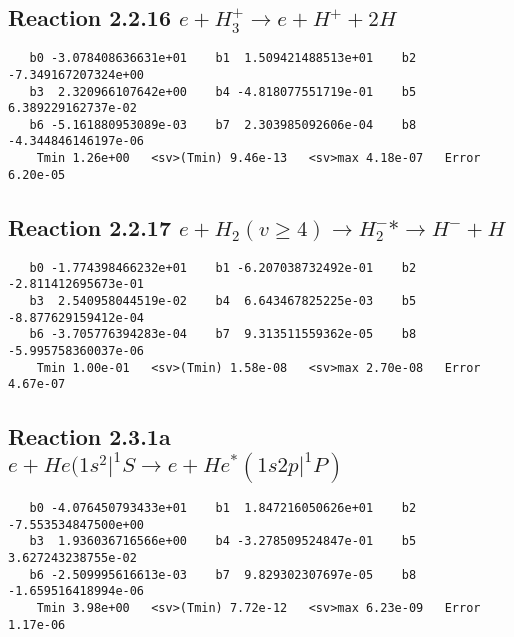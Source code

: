\documentclass[12pt]{article}
\begin{document}
                        


\newpage
\subsection{
Reaction 2.2.16 $  e + H_3^+ \rightarrow e + H^+ + 2H$}


\begin{small}\begin{verbatim}
   b0 -3.078408636631e+01    b1  1.509421488513e+01    b2 -7.349167207324e+00
   b3  2.320966107642e+00    b4 -4.818077551719e-01    b5  6.389229162737e-02
   b6 -5.161880953089e-03    b7  2.303985092606e-04    b8 -4.344846146197e-06
    Tmin 1.26e+00   <sv>(Tmin) 9.46e-13   <sv>max 4.18e-07   Error 6.20e-05
\end{verbatim}\end{small}

\newpage
\subsection{
Reaction 2.2.17 $  e + H_2(v \geq 4) \rightarrow H_2^-* \rightarrow H^- + H$}


\begin{small}\begin{verbatim}
   b0 -1.774398466232e+01    b1 -6.207038732492e-01    b2 -2.811412695673e-01
   b3  2.540958044519e-02    b4  6.643467825225e-03    b5 -8.877629159412e-04
   b6 -3.705776394283e-04    b7  9.313511559362e-05    b8 -5.995758360037e-06
    Tmin 1.00e-01   <sv>(Tmin) 1.58e-08   <sv>max 2.70e-08   Error 4.67e-07
\end{verbatim}\end{small}

\newpage
\subsection{
Reaction 2.3.1a $e + He(1s^2|^1S \rightarrow e + He^*(1s2p|^1P)$}















\begin{small}\begin{verbatim}
   b0 -4.076450793433e+01    b1  1.847216050626e+01    b2 -7.553534847500e+00
   b3  1.936036716566e+00    b4 -3.278509524847e-01    b5  3.627243238755e-02
   b6 -2.509995616613e-03    b7  9.829302307697e-05    b8 -1.659516418994e-06
    Tmin 3.98e+00   <sv>(Tmin) 7.72e-12   <sv>max 6.23e-09   Error 1.17e-06
\end{verbatim}\end{small}
\end{document}
